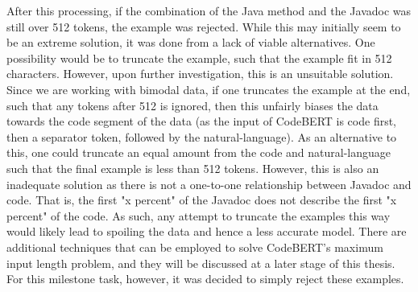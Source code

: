 \noindent
After this processing, if the combination of the Java method and the Javadoc was still over 512 tokens, the example was rejected. While this may initially seem to be an extreme solution, it was done from a lack of viable alternatives. One possibility would be to truncate the example, such that the example fit in 512 characters. However, upon further investigation, this is an unsuitable solution. Since we are working with bimodal data, if one truncates the example at the end, such that any tokens after 512 is ignored, then this unfairly biases the data towards the code segment of the data (as the input of CodeBERT is code first, then a separator token, followed by the natural-language). As an alternative to this, one could truncate an equal amount from the code and natural-language such that the final example is less than 512 tokens. However, this is also an inadequate solution as there is not a one-to-one relationship between Javadoc and code. That is, the first "x percent" of the Javadoc does not describe the first "x percent" of the code. As such, any attempt to truncate the examples this way would likely lead to spoiling the data and hence a less accurate model. There are additional techniques that can be employed to solve CodeBERT's maximum input length problem, and they will be discussed at a later stage of this thesis. For this milestone task, however, it was decided to simply reject these examples.\\




